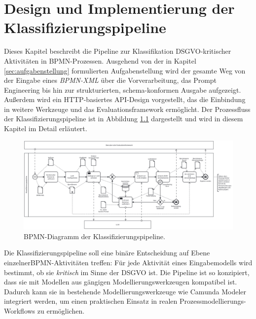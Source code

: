 \chapter{Design und Implementierung der Klassifizierungspipeline}\label{ch:klassifizierungsalgorithmus-(design-und-implementierung)}

Dieses Kapitel beschreibt die Pipeline zur Klassifikation \ac{DSGVO}-kritischer Aktivitäten in \ac{BPMN}-Prozessen. Ausgehend von der in Kapitel \ref{sec:aufgabenstellung} formulierten Aufgabenstellung wird der gesamte Weg von der Eingabe eines \emph{BPMN-XML} über die Vorverarbeitung, das Prompt Engineering bis hin zur strukturierten, schema-konformen Ausgabe aufgezeigt. Außerdem wird ein HTTP-basiertes API-Design vorgestellt, das die Einbindung in weitere Werkzeuge und das Evaluationsframework ermöglicht. Der Prozessfluss der Klassifizierungspipeline ist in Abbildung \ref{fig:architecture-diagram} dargestellt und wird in diesem Kapitel im Detail erläutert.

\begin{figure}[h]
    \centering
    \includegraphics[width=\textwidth]{images/classification/classification-pipeline-diagram}
    \caption{\ac{BPMN}-Diagramm der Klassifizierungspipeline.}
    \label{fig:architecture-diagram}
\end{figure}

Die Klassifizierungspipeline soll eine binäre Entscheidung auf Ebene einzelner\linebreak\ac{BPMN}-Aktivitäten treffen: Für jede Aktivität eines Eingabemodells wird bestimmt, ob sie \emph{kritisch} im Sinne der \ac{DSGVO} ist. Die Pipeline ist so konzipiert, dass sie mit Modellen aus gängigen Modellierungswerkzeugen kompatibel ist. Dadurch kann sie in bestehende Modellierungswerkzeuge wie Camunda Modeler \cite{camunda} integriert werden, um einen praktischen Einsatz in realen Prozessmodellierungs-Workflows zu ermöglichen.







